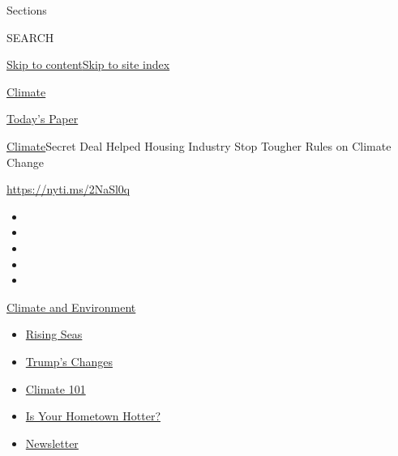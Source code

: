 Sections

SEARCH

\protect\hyperlink{site-content}{Skip to
content}\protect\hyperlink{site-index}{Skip to site index}

\href{https://www.nytimes3xbfgragh.onion/section/climate}{Climate}

\href{https://myaccount.nytimes3xbfgragh.onion/auth/login?response_type=cookie\&client_id=vi}{}

\href{https://www.nytimes3xbfgragh.onion/section/todayspaper}{Today's
Paper}

\href{/section/climate}{Climate}\textbar{}Secret Deal Helped Housing
Industry Stop Tougher Rules on Climate Change

\url{https://nyti.ms/2NaSl0q}

\begin{itemize}
\item
\item
\item
\item
\item
\end{itemize}

\href{https://www.nytimes3xbfgragh.onion/section/climate?action=click\&pgtype=Article\&state=default\&region=TOP_BANNER\&context=storylines_menu}{Climate
and Environment}

\begin{itemize}
\tightlist
\item
  \href{https://www.nytimes3xbfgragh.onion/2020/07/30/climate/sea-level-inland-floods.html?action=click\&pgtype=Article\&state=default\&region=TOP_BANNER\&context=storylines_menu}{Rising
  Seas}
\item
  \href{https://www.nytimes3xbfgragh.onion/interactive/2020/climate/trump-environment-rollbacks.html?action=click\&pgtype=Article\&state=default\&region=TOP_BANNER\&context=storylines_menu}{Trump's
  Changes}
\item
  \href{https://www.nytimes3xbfgragh.onion/interactive/2020/04/19/climate/climate-crash-course-1.html?action=click\&pgtype=Article\&state=default\&region=TOP_BANNER\&context=storylines_menu}{Climate
  101}
\item
  \href{https://www.nytimes3xbfgragh.onion/interactive/2018/08/30/climate/how-much-hotter-is-your-hometown.html?action=click\&pgtype=Article\&state=default\&region=TOP_BANNER\&context=storylines_menu}{Is
  Your Hometown Hotter?}
\item
  \href{https://www.nytimes3xbfgragh.onion/newsletters/climate-change?action=click\&pgtype=Article\&state=default\&region=TOP_BANNER\&context=storylines_menu}{Newsletter}
\end{itemize}

